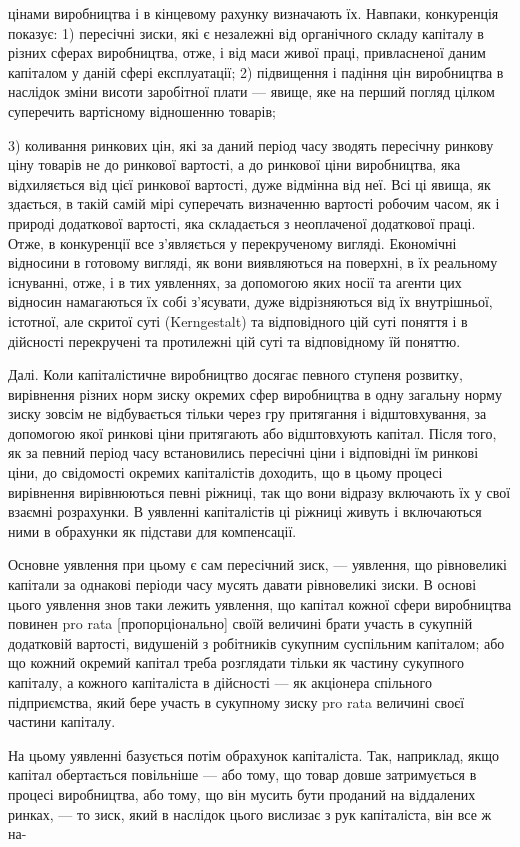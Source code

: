 цінами виробництва і в кінцевому рахунку визначають їх. Навпаки,
конкуренція показує: 1) пересічні зиски, які є незалежні від
органічного складу капіталу в різних сферах виробництва, отже,
і від маси живої праці, привласненої даним капіталом у даній сфері
експлуатації; 2) підвищення і падіння цін виробництва в наслідок
зміни висоти заробітної плати — явище, яке на перший
погляд цілком суперечить вартісному відношенню товарів;

3) коливання ринкових цін, які за даний період часу зводять
пересічну ринкову ціну товарів не до ринкової вартості, а до
ринкової ціни виробництва, яка відхиляється від цієї ринкової
вартості, дуже відмінна від неї. Всі ці явища, як здається, в такій
самій мірі суперечать визначенню вартості робочим часом,
як і природі додаткової вартості, яка складається з неоплаченої
додаткової праці. Отже, в конкуренції все з’являється у перекрученому
вигляді. Економічні відносини в готовому вигляді, як
вони виявляються на поверхні, в їх реальному існуванні, отже,
і в тих уявленнях, за допомогою яких носії та агенти цих
відносин намагаються їх собі з’ясувати, дуже відрізняються
від їх внутрішньої, істотної, але скритої суті (Kerngestalt) та відповідного
цій суті поняття і в дійсності перекручені та протилежні
цій суті та відповідному їй поняттю.

Далі. Коли капіталістичне виробництво досягає певного ступеня
розвитку, вирівнення різних норм зиску окремих сфер виробництва
в одну загальну норму зиску зовсім не відбувається
тільки через гру притягання і відштовхування, за допомогою
якої ринкові ціни притягають або відштовхують капітал. Після
того, як за певний період часу встановились пересічні ціни
і відповідні їм ринкові ціни, до свідомості окремих капіталістів
доходить, що в цьому процесі вирівнення вирівнюються певні
ріжниці, так що вони відразу включають їх у свої взаємні розрахунки.
В уявленні капіталістів ці ріжниці живуть і включаються
ними в обрахунки як підстави для компенсації.

Основне уявлення при цьому є сам пересічний зиск, —
уявлення, що рівновеликі капітали за однакові періоди часу мусять
давати рівновеликі зиски. В основі цього уявлення знов
таки лежить уявлення, що капітал кожної сфери виробництва
повинен pro rata [пропорціонально] своїй величині брати участь
в сукупній додатковій вартості, видушеній з робітників сукупним
суспільним капіталом; або що кожний окремий капітал треба
розглядати тільки як частину сукупного капіталу, а кожного
капіталіста в дійсності — як акціонера спільного підприємства,
який бере участь в сукупному зиску pro rata величині своєї частини
капіталу.

На цьому уявленні базується потім обрахунок капіталіста.
Так, наприклад, якщо капітал обертається повільніше — або тому,
що товар довше затримується в процесі виробництва, або тому,
що він мусить бути проданий на віддалених ринках, — то зиск,
який в наслідок цього вислизає з рук капіталіста, він все ж на-
